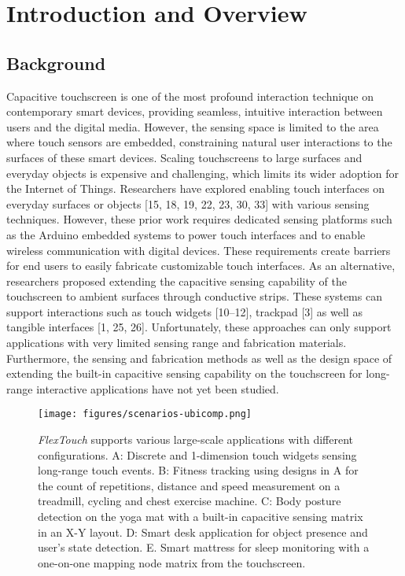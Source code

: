 \chapter{Introduction and Overview}
    \label{cha:intro}

\section{Background}
Capacitive touchscreen is one of the most profound interaction technique on contemporary smart devices, providing seamless, intuitive interaction between users and the digital media. However, the sensing space is limited to the area where touch sensors are embedded, constraining natural user interactions to the surfaces of these smart devices. Scaling touchscreens to large surfaces and everyday objects is expensive and challenging, which limits its wider adoption for the Internet of Things. Researchers have explored enabling touch interfaces on everyday surfaces or objects [15, 18, 19, 22, 23, 30, 33] with various sensing techniques. However, these prior work requires dedicated sensing platforms such as the Arduino embedded systems to power touch interfaces and to enable wireless communication with digital devices. These requirements create barriers for end users to easily fabricate customizable touch interfaces. As an alternative, researchers proposed extending the capacitive sensing capability of the touchscreen to ambient surfaces through conductive strips. These systems can support interactions such as touch widgets [10–12], trackpad [3] as well as tangible interfaces [1, 25, 26]. Unfortunately, these approaches can only support applications with very limited sensing range and fabrication materials. Furthermore, the sensing and fabrication methods as well as the design space of extending the built-in capacitive sensing capability on the touchscreen for long-range interactive applications have not yet been studied.

\begin{figure}
    \centering
      \texttt{[image: figures/scenarios-ubicomp.png]}
      \setlength{\belowcaptionskip}{-15pt}
      \caption{\textit{FlexTouch} supports various large-scale applications with different configurations. A: Discrete and 1-dimension touch widgets sensing long-range touch events. B: Fitness tracking using designs in A for the count of repetitions, distance and speed measurement on a treadmill, cycling and chest exercise machine. C: Body posture detection on the yoga mat with a built-in capacitive sensing matrix in an X-Y layout. D: Smart desk application for object presence and user's state detection. E. Smart mattress for sleep monitoring with a one-on-one mapping node matrix from the touchscreen.}
      \label{fig:scenarios}
\end{figure}

